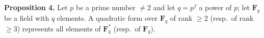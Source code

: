 \textbf{Proposition 4.} Let $p$ be a prime number $\neq 2$ and let $q = p^f$ a power of $p$; let $\mathbf{F}_q$ be a field with $q$ elements. A quadratic form over $\mathbf{F}_q$ of rank $\ge 2$ (resp.\ of rank $\ge 3$) represents all elements of $\mathbf{F}_q^*$ (resp.\ of $\mathbf{F}_q$).

